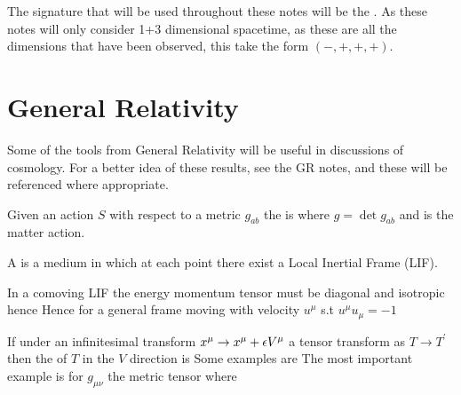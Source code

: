 \documentclass{article}
\begin{document}
\begin{definition}
The signature that will be used throughout these notes will be the . As these notes will only consider 1+3 dimensional spacetime, as these are all the dimensions that have been observed, this take the form $(-,+,+,+)$. 
\end{definition}
\section{General Relativity}
Some of the tools from General Relativity will be useful in discussions of cosmology. For a better idea of these results, see the GR notes, and these will be referenced where appropriate. 

\begin{definition}
Given an action $S$ with respect to a metric $g_{ab}$ the  is 
where $g=\det g_{ab}$ and 
is the matter action. 
\end{definition}

\begin{definition}
A  is a medium in which at each point there exist a Local Inertial Frame (LIF). 
\end{definition}

\begin{fact}
In a comoving LIF the energy momentum tensor must be diagonal and isotropic hence 
Hence for a general frame moving with velocity $u^\mu$ s.t $u^\mu u_\mu = - 1$ 
\end{fact}


\begin{definition}
If under an infinitesimal transform $x^\mu \to x^\mu + \epsilon V^\mu$ a tensor transform as $T \to T^\prime$ then the  of $T$ in the $V$ direction is 
Some examples are 
The most important example is for $g_{\mu\nu}$ the metric tensor where
\end{definition}
\end{document}

